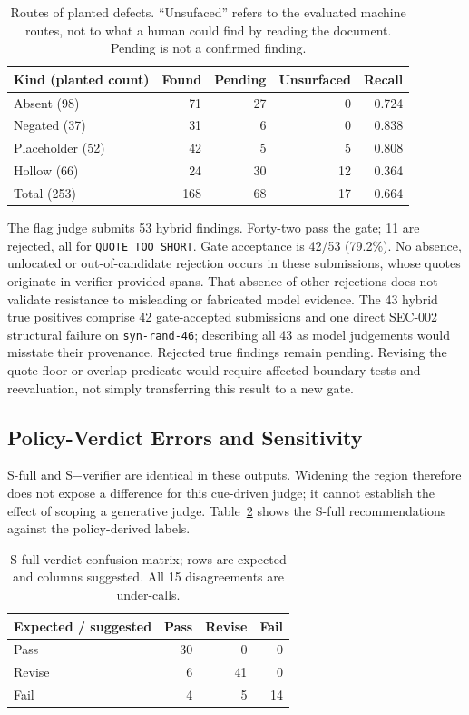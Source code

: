 \begin{table}[!ht]
\caption{Routes of planted defects. ``Unsufaced'' refers to the evaluated machine routes, not to what a human could find by reading the document. Pending is not a confirmed finding.}
\label{tab:kinds}
\centering\footnotesize
\begin{tabular}{@{}lrrrr@{}}
\toprule
Kind (planted count) & Found & Pending & Unsurfaced & Recall \\
\midrule
Absent (98) & 71 & 27 & 0 & 0.724 \\
Negated (37) & 31 & 6 & 0 & 0.838 \\
Placeholder (52) & 42 & 5 & 5 & 0.808 \\
Hollow (66) & 24 & 30 & 12 & 0.364 \\
\midrule
Total (253) & 168 & 68 & 17 & 0.664 \\
\bottomrule
\end{tabular}
\end{table}

The flag judge submits 53 hybrid findings. Forty-two pass the gate; 11 are rejected, all for \texttt{QUOTE\_TOO\_SHORT}. Gate acceptance is 42/53 (79.2\%). No absence, unlocated or out-of-candidate rejection occurs in these submissions, whose quotes originate in verifier-provided spans. That absence of other rejections does not validate resistance to misleading or fabricated model evidence. The 43 hybrid true positives comprise 42 gate-accepted submissions and one direct SEC-002 structural failure on \texttt{syn-rand-46}; describing all 43 as model judgements would misstate their provenance. Rejected true findings remain pending. Revising the quote floor or overlap predicate would require affected boundary tests and reevaluation, not simply transferring this result to a new gate.

\subsection{Policy-Verdict Errors and Sensitivity}\label{sec:threshold}

S-full and S$-$verifier are identical in these outputs. Widening the region therefore does not expose a difference for this cue-driven judge; it cannot establish the effect of scoping a generative judge. Table~\ref{tab:confusion} shows the S-full recommendations against the policy-derived labels.

\begin{table}[!ht]
\caption{S-full verdict confusion matrix; rows are expected and columns suggested. All 15 disagreements are under-calls.}
\label{tab:confusion}
\centering\small
\begin{tabular}{@{}lrrr@{}}
\toprule
Expected / suggested & Pass & Revise & Fail \\
\midrule
Pass & 30 & 0 & 0 \\
Revise & 6 & 41 & 0 \\
Fail & 4 & 5 & 14 \\
\bottomrule
\end{tabular}
\end{table}

